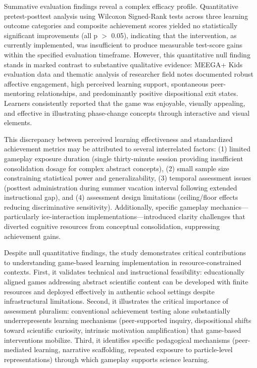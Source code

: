 Summative evaluation findings reveal a complex efficacy profile. Quantitative pretest-posttest analysis using Wilcoxon Signed-Rank tests across three learning outcome categories and composite achievement scores yielded no statistically significant improvements (all p $>$ 0.05), indicating that the intervention, as currently implemented, was insufficient to produce measurable test-score gains within the specified evaluation timeframe. However, this quantitative null finding stands in marked contrast to substantive qualitative evidence: MEEGA+ Kids evaluation data and thematic analysis of researcher field notes documented robust affective engagement, high perceived learning support, spontaneous peer-mentoring relationships, and predominantly positive dispositional exit states. Learners consistently reported that the game was enjoyable, visually appealing, and effective in illustrating phase-change concepts through interactive and visual elements.

This discrepancy between perceived learning effectiveness and standardized achievement metrics may be attributed to several interrelated factors: (1) limited gameplay exposure duration (single thirty-minute session providing insufficient consolidation dosage for complex abstract concepts), (2) small sample size constraining statistical power and generalizability, (3) temporal assessment issues (posttest administration during summer vacation interval following extended instructional gap), and (4) assessment design limitations (ceiling/floor effects reducing discriminative sensitivity). Additionally, specific gameplay mechanics---particularly ice-interaction implementations---introduced clarity challenges that diverted cognitive resources from conceptual consolidation, suppressing achievement gains.

Despite null quantitative findings, the study demonstrates critical contributions to understanding game-based learning implementation in resource-constrained contexts. First, it validates technical and instructional feasibility: educationally aligned games addressing abstract scientific content can be developed with finite resources and deployed effectively in authentic school settings despite infrastructural limitations. Second, it illustrates the critical importance of assessment pluralism: conventional achievement testing alone substantially underrepresents learning mechanisms (peer-supported inquiry, dispositional shifts toward scientific curiosity, intrinsic motivation amplification) that game-based interventions mobilize. Third, it identifies specific pedagogical mechanisms (peer-mediated learning, narrative scaffolding, repeated exposure to particle-level representations) through which gameplay supports science learning.


